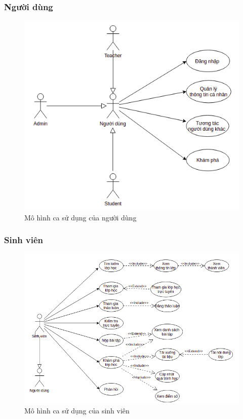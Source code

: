 \documentclass[./../main_file.tex]{subfiles}
\begin{document}
	\subsubsection{Người dùng}
	\begin{figure}[H]
		\centering
		\includegraphics[width=1.0\textwidth]{./images/usecaseuser.png}
		\caption{ Mô hình ca sử dụng của người dùng}
	\end{figure}
	\subsubsection{Sinh viên}
	\begin{figure}[H]
		\centering
		\includegraphics[width=\textwidth]{./images/usecasestudent.png}
		\caption{Mô hình ca sử dụng của sinh viên}
	\end{figure}
\end{document}
